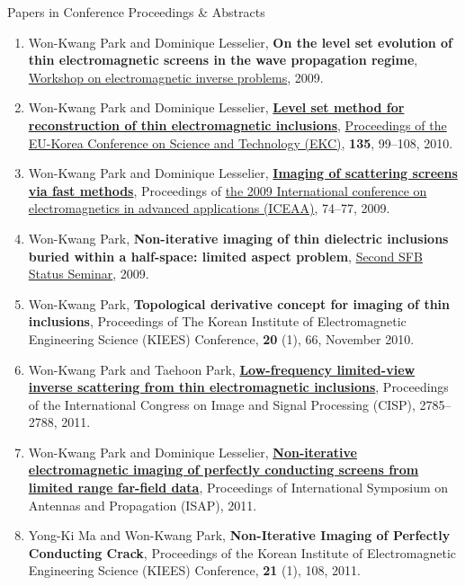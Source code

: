 \documentclass{resume} %
\begin{document}
\begin{rSection}{Papers in Conference Proceedings \& Abstracts}
\begin{enumerate}
\item\label{C-EIT2009} Won-Kwang Park and Dominique Lesselier, \textbf{On the level set evolution of thin electromagnetic screens in the wave propagation regime}, \href{http://www.maths.manchester.ac.uk/eit2009/}{Workshop on electromagnetic inverse problems}, 2009.
\item\label{C-EKC2009} Won-Kwang Park and Dominique Lesselier, \href{http://dx.doi.org/10.1007/978-3-642-13624-5_11}{\textbf{Level set method for reconstruction of thin electromagnetic inclusions}}, \href{http://www.springer.com/engineering/book/978-3-642-13623-8}{Proceedings of the EU-Korea Conference on Science and Technology (EKC)}, \textbf{135}, 99--108, 2010.
\item\label{C-ICEAA2009} Won-Kwang Park and Dominique Lesselier, \href{http://dx.doi.org/10.1109/ICEAA.2009.5297605}{\textbf{Imaging of scattering screens via fast methods}}, Proceedings of \href{http://www.iceaa.net/}{the 2009 International conference on electromagnetics in advanced applications (ICEAA)}, 74--77, 2009.
\item\label{C-SFB2009} Won-Kwang Park, \textbf{Non-iterative imaging of thin dielectric inclusions buried within a half-space: limited aspect problem}, \href{http://math.uni-graz.at/mobis/meetings.html}{Second SFB Status Seminar}, 2009.
\item\label{C-KIEES2010} Won-Kwang Park, \textbf{Topological derivative concept for imaging of thin inclusions}, Proceedings of The Korean Institute of Electromagnetic Engineering Science (KIEES) Conference, \textbf{20} (1), 66, November 2010.
\item\label{C-CISP2011} Won-Kwang Park and Taehoon Park, \href{http://dx.doi.org/10.1109/CISP.2011.6100710}{\textbf{Low-frequency limited-view inverse scattering from thin electromagnetic inclusions}}, Proceedings of the  International Congress on Image and Signal Processing (CISP), 2785--2788, 2011.
\item\label{C-ISAP2011} Won-Kwang Park and Dominique Lesselier, \href{http://ap-s.ei.tuat.ac.jp/isapx/2011/}{\textbf{Non-iterative electromagnetic imaging of perfectly conducting screens from limited range far-field data}}, Proceedings of International Symposium on Antennas and Propagation (ISAP), 2011.
\item\label{C-KIEES2011} Yong-Ki Ma and Won-Kwang Park, \textbf{Non-Iterative Imaging of Perfectly Conducting Crack}, Proceedings of the Korean Institute of Electromagnetic Engineering Science (KIEES) Conference, \textbf{21} (1), 108, 2011.

\end{enumerate}
\end{rSection}
\end{document}
